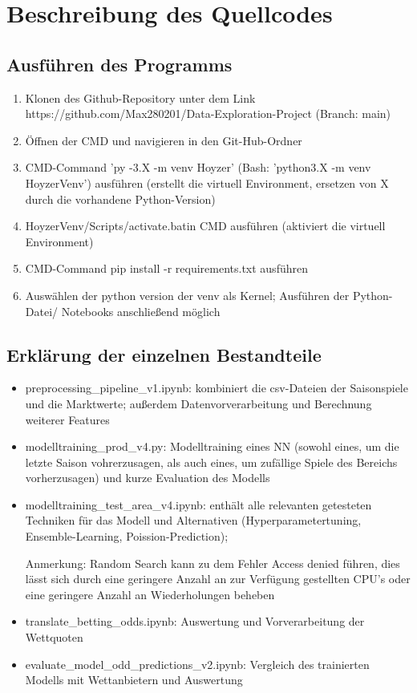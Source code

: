 \chapter{Beschreibung des Quellcodes}
\section{Ausführen des Programms}
\begin{enumerate}
	\item Klonen des Github-Repository unter dem Link https://github.com/Max280201/Data-Exploration-Project (Branch: main)
	\item Öffnen der CMD und navigieren in den Git-Hub-Ordner
	\item CMD-Command 'py -3.X -m venv Hoyzer' (Bash: 'python3.X -m venv HoyzerVenv') ausführen (erstellt die virtuell Environment, ersetzen von X durch die vorhandene Python-Version)
	\item \grqq HoyzerVenv/Scripts/activate.bat\grqq in CMD ausführen (aktiviert die virtuell Environment)
	\item CMD-Command \grqq pip install -r requirements.txt\grqq{} ausführen
	\item Auswählen der python version der venv als Kernel; Ausführen der Python-Datei/ Notebooks anschließend möglich
\end{enumerate}

\section{Erklärung der einzelnen Bestandteile}
\begin{itemize}
	\item preprocessing\_pipeline\_v1.ipynb: kombiniert die csv-Dateien der Saisonspiele und die Marktwerte; außerdem Datenvorverarbeitung und Berechnung weiterer Features
	\item modelltraining\_prod\_v4.py: Modelltraining eines NN (sowohl eines, um die letzte Saison vohrerzusagen, als auch eines, um zufällige Spiele des Bereichs vorherzusagen) und kurze Evaluation des Modells
	\item modelltraining\_test\_area\_v4.ipynb: enthält alle relevanten getesteten Techniken für das Modell und Alternativen (Hyperparametertuning, Ensemble-Learning, Poission-Prediction);
	
	Anmerkung: Random Search kann zu dem Fehler \grqq Access denied\grqq{} führen, dies lässt sich durch eine geringere Anzahl an zur Verfügung gestellten CPU's oder eine geringere Anzahl an Wiederholungen beheben
	
	\item translate\_betting\_odds.ipynb: Auswertung und Vorverarbeitung der Wettquoten
	\item evaluate\_model\_odd\_predictions\_v2.ipynb: Vergleich des trainierten Modells mit Wettanbietern und Auswertung
\end{itemize}